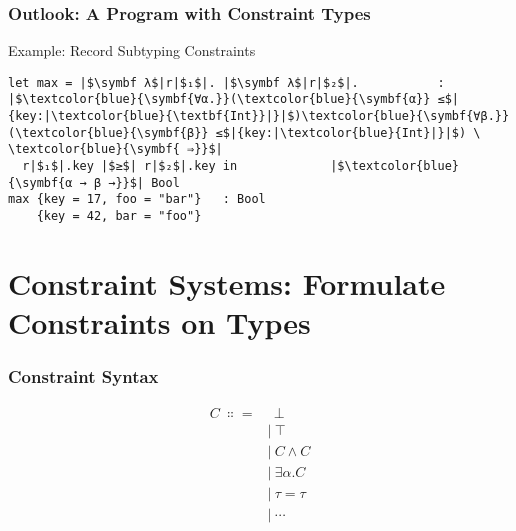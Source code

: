 \documentclass[aspectratio=169]{beamer}
\begin{document}
\begingroup
\large
\begin{frame}[fragile]
  \frametitle{Outlook: A Program with Constraint Types}
  \begin{center}
    \begin{block}{Example: Record Subtyping Constraints}
      \begin{verbatim}
let max = |$\symbf λ$|r|$₁$|. |$\symbf λ$|r|$₂$|.           : |$\textcolor{blue}{\symbf{∀α.}}(\textcolor{blue}{\symbf{α}} ≤$|{key:|\textcolor{blue}{\textbf{Int}}|}|$)\textcolor{blue}{\symbf{∀β.}}(\textcolor{blue}{\symbf{β}} ≤$|{key:|\textcolor{blue}{Int}|}|$) \ \textcolor{blue}{\symbf{ ⇒}}$|
  r|$₁$|.key |$≥$| r|$₂$|.key in             |$\textcolor{blue}{\symbf{α → β →}}$| Bool
max {key = 17, foo = "bar"}   : Bool
    {key = 42, bar = "foo"}
          \end{verbatim}
    \end{block}
  \end{center}
\end{frame}
\endgroup

\section{Constraint Systems: Formulate Constraints on Types}

\begingroup
\Large
\begin{frame}[fragile]
  \frametitle{Constraint Syntax}
  \begin{align*}
    C \ ∷= & \ \ ⊥     \\
           & | \ ⊤     \\
           & | \ C ∧ C \\
           & | \ ∃α. C \\
           & | \ τ = τ \\
           & | \ ⋯
  \end{align*}
\end{frame}
\endgroup
\end{document}
